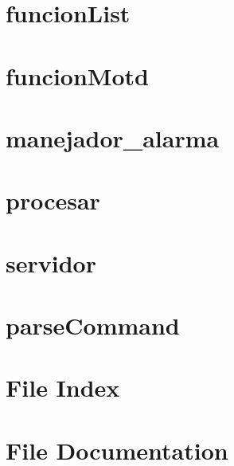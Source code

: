 \documentclass[twoside]{book}
\newcommand{\+}{\discretionary{\mbox{\scriptsize$\hookleftarrow$}}{}{}}
\newcommand{\clearemptydoublepage}{%
  \newpage{\pagestyle{empty}\cleardoublepage}%
}
\begin{document}
\chapter{funcion\+List}
\label{funcion_list}
\hypertarget{funcion_list}{}

\chapter{funcion\+Motd}
\label{funcion_motd}
\hypertarget{funcion_motd}{}

\chapter{manejador\+\_\+alarma}
\label{manejador_alarma}
\hypertarget{manejador_alarma}{}

\chapter{procesar}
\label{procesar}
\hypertarget{procesar}{}

\chapter{servidor}
\label{servidor}
\hypertarget{servidor}{}

\chapter{parse\+Command}
\label{parse_command}
\hypertarget{parse_command}{}

\chapter{File Index}

\chapter{File Documentation}










\backmatter
\newpage
{}
\clearemptydoublepage
{}
\printindex
\end{document}
